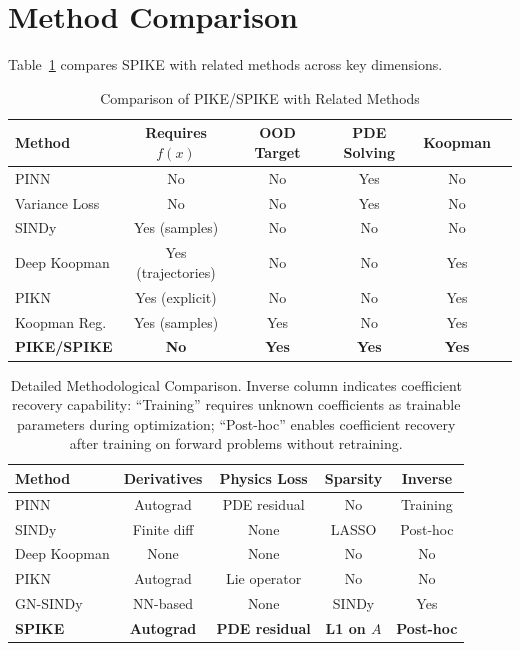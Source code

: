 \documentclass{article}
\theoremstyle{remark}
\begin{document}
\FloatBarrier
\section{Method Comparison}
\label{app:method_comparison}

Table~\ref{tab:related_comparison} compares SPIKE with related methods across key dimensions.

\begin{table}[H]
\centering
\caption{Comparison of PIKE/SPIKE with Related Methods}
\label{tab:related_comparison}
\begin{tabular}{lccccc}
\toprule
Method & Requires $f(x)$ & OOD Target & PDE Solving & Koopman \\
\midrule
PINN \citep{raissi2019pinn} & No & No & Yes & No \\
Variance Loss \citep{hanna2025variance} & No & No & Yes & No \\
SINDy \citep{brunton2016sindy} & Yes (samples) & No & No & No \\
Deep Koopman \citep{lusch2018deep} & Yes (trajectories) & No & No & Yes \\
PIKN \citep{liu2022physicskoopman} & Yes (explicit) & No & No & Yes \\
Koopman Reg. \citep{cohen2025koopman} & Yes (samples) & Yes & No & Yes \\
\textbf{PIKE/SPIKE} & \textbf{No} & \textbf{Yes} & \textbf{Yes} & \textbf{Yes} \\
\bottomrule
\end{tabular}
\end{table}

\begin{table}[H]
\centering
\caption{Detailed Methodological Comparison. Inverse column indicates coefficient recovery capability: ``Training'' requires unknown coefficients as trainable parameters during optimization; ``Post-hoc'' enables coefficient recovery after training on forward problems without retraining.}
\label{tab:method_details}
\begin{tabular}{lcccc}
\toprule
Method & Derivatives & Physics Loss & Sparsity & Inverse \\
\midrule
PINN \citep{raissi2019pinn} & Autograd & PDE residual & No & Training \\
SINDy \citep{brunton2016sindy} & Finite diff & None & LASSO & Post-hoc \\
Deep Koopman \citep{lusch2018deep} & None & None & No & No \\
PIKN \citep{liu2022physicskoopman} & Autograd & Lie operator & No & No \\
GN-SINDy \citep{tang2024gnsindy} & NN-based & None & SINDy & Yes \\
\textbf{SPIKE} & \textbf{Autograd} & \textbf{PDE residual} & \textbf{L1 on $A$} & \textbf{Post-hoc} \\
\bottomrule
\end{tabular}
\end{table}
\end{document}

